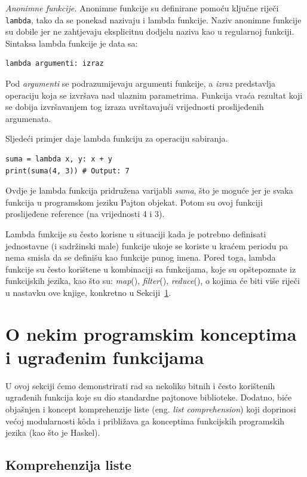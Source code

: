 \textit{Anonimne funkcije.}  Anonimne funkcije su definirane pomoću ključne riječi \texttt{lambda}, tako da se ponekad nazivaju i lambda funkcije.  Naziv anonimne funkcije su dobile jer ne zahtjevaju eksplicitnu dodjelu naziva kao u regularnoj funkciji. Sintaksa lambda funkcije je data sa:

\begin{verbatim}
lambda argumenti: izraz
\end{verbatim}
Pod \textit{argumenti} se podrazumijevaju argumenti funkcije, a \textit{izraz} predstavlja operaciju koja se izvršava nad ulaznim parametrima. Funkcija vraća rezultat koji se dobija izvršavanjem tog izraza uvrštavajući vrijednosti proslijeđenih argumenata. 

Sljedeći primjer daje lambda funkciju za operaciju sabiranja.
\begin{verbatim}
suma = lambda x, y: x + y
print(suma(4, 3)) # Output: 7
\end{verbatim}

Ovdje je lambda funkcija pridružena varijabli \textit{suma}, što je moguće jer je svaka funkcija u programskom jeziku Pajton objekat. Potom su ovoj funkciji proslijeđene reference (na vrijednosti 4 i 3). 

Lambda funkcije su često korisne u situaciji kada je potrebno definisati jednostavne (i sadržinski male) funkcije ukoje se koriste u kraćem periodu pa nema smisla da se definišu kao funkcije punog imena. Pored toga, lambda funkcije su često korištene u kombinaciji sa funkcijama, koje su opštepoznate iz funkcijskih jezika, kao što su: \textit{map}(), \textit{filter}(), \textit{reduce}(), o kojima će biti više riječi u nastavku ove knjige, konkretno u Sekciji~\ref{sec:concepts-pyhton}. 




\section{O nekim programskim konceptima i ugrađenim funkcijama} \label{sec:concepts-pyhton}

U ovoj sekciji ćemo demonstrirati rad sa nekoliko bitnih i često korištenih ugrađenih funkcija koje su dio standardne pajtonove biblioteke. Dodatno, biće objašnjen i koncept komprehenzije liste (eng. \textit{list comprehension}) koji  doprinosi većoj modularnosti k\^oda i približava ga konceptima funkcijskih programskih jezika (kao što je Haskel). 

\subsection{Komprehenzija liste}

